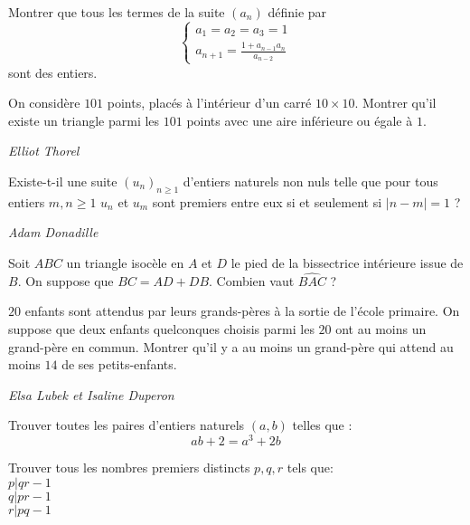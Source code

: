 \begin{exo}{}
Montrer que tous les termes de la suite $\left(a_{n}\right)$ définie par
\[\begin{cases}
a_{1}=a_{2}=a_{3}=1\\
a_{n+1}=\frac{1+a_{n-1}a_{n}}{a_{n-2}}
\end{cases}\]
sont des entiers.
\end{exo}

\begin{exo}{}
On considère $101$ points, placés à l'intérieur d'un carré $10\times10$. Montrer qu'il existe un triangle parmi les $101$ points avec une aire inférieure ou égale à $1$.

\medskip
\textit{Elliot Thorel}
\end{exo}

\begin{exo}{}
 Existe-t-il une
suite $\left(u_{n}\right)_{n \geq 1}$ d'entiers naturels non nuls telle que pour tous entiers $m,n \geq 1$
$u_{n}$ et $u_{m}$ sont premiers entre eux si et seulement si $\left|n-m\right|=1$
?

\medskip
\textit{Adam Donadille}
\end{exo}

\begin{exo}{}
Soit $ABC$ un triangle isocèle en $A$ et $D$ le pied de la bissectrice intérieure issue de $B$. On suppose que $BC=AD+DB$. Combien vaut $\widehat{BAC}$ ?
\end{exo}

\begin{exo}{}
$20$ enfants sont attendus par leurs grands-pères à la sortie de l’école primaire.
On suppose que deux enfants quelconques choisis parmi les $20$ ont au moins un grand-père en commun.
Montrer qu’il y a au moins un grand-père qui attend au moins $14$ de ses petits-enfants.

\medskip
\textit{Elsa Lubek et Isaline Duperon}
\end{exo}

\begin{exo}{}
Trouver toutes les paires d'entiers naturels $(a,b)$ telles que :
$$ab+2=a^3+2b$$
\end{exo}

\begin{exo}{}
Trouver tous les nombres premiers distincts $p,q,r$ tels que:\\
$ p|qr-1$\\
$ q|pr-1$\\
$ r|pq-1$\\
\end{exo}

